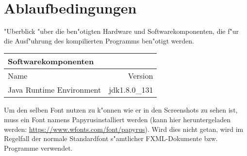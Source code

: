 \section{Ablaufbedingungen}
"Uberblick "uber die ben"otigten Hardware und Softwarekomponenten, die f"ur die Ausf"uhrung des kompilierten Programms ben"otigt werden. 

\begin{table}[h!]
	\begin{tabular}{lr} 
	\toprule
	Softwarekomponenten\\  
	\midrule 
	Name & Version\\ 
	\midrule 
	Java Runtime Environment & jdk1.8.0\_131\\ 
	\bottomrule
	\end{tabular}
	\label{tab:ablaufbedingungen}
\end{table}

Um den selben Font nutzen zu k"onnen wie er in den Screenshots zu sehen ist, muss ein Font namens \glqq Papyrus\grqq  installiert werden (kann hier heruntergeladen werden: \url{https://www.wfonts.com/font/papyrus}). Wird dies nicht getan, wird im Regelfall der normale Standardfont s"amtlicher FXML-Dokumente bzw. Programme verwendet. 
